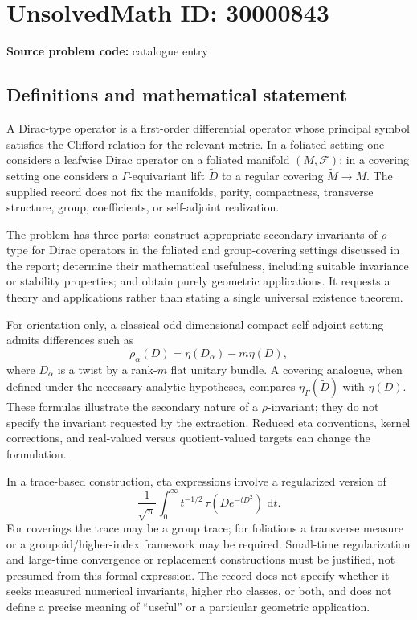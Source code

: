\documentclass[11pt]{article}
\newcommand{\dd}{\,\mathrm{d}}
\begin{document}
\section*{UnsolvedMath ID: 30000843}
\textbf{Source problem code:} catalogue entry
\subsection{Definitions and mathematical statement}
A Dirac-type operator is a first-order differential operator whose principal symbol satisfies the Clifford relation for the relevant metric. In a foliated setting one considers a leafwise Dirac operator on a foliated manifold \((M,\mathcal F)\); in a covering setting one considers a \(\Gamma\)-equivariant lift \(\widetilde D\) to a regular covering \(\widetilde M\to M\). The supplied record does not fix the manifolds, parity, compactness, transverse structure, group, coefficients, or self-adjoint realization.

The problem has three parts: construct appropriate secondary invariants of \(\rho\)-type for Dirac operators in the foliated and group-covering settings discussed in the report; determine their mathematical usefulness, including suitable invariance or stability properties; and obtain purely geometric applications. It requests a theory and applications rather than stating a single universal existence theorem.

For orientation only, a classical odd-dimensional compact self-adjoint setting admits differences such as
\[
 \rho_\alpha(D)=\eta(D_\alpha)-m\eta(D),
\]
where \(D_\alpha\) is a twist by a rank-\(m\) flat unitary bundle. A covering analogue, when defined under the necessary analytic hypotheses, compares \(\eta_\Gamma(\widetilde D)\) with \(\eta(D)\). These formulas illustrate the secondary nature of a \(\rho\)-invariant; they do not specify the invariant requested by the extraction. Reduced eta conventions, kernel corrections, and real-valued versus quotient-valued targets can change the formulation.

In a trace-based construction, eta expressions involve a regularized version of
\[
 \frac1{\sqrt\pi}\int_0^\infty
 t^{-1/2}\,\tau(D e^{-tD^2})\,\dd t.
\]
For coverings the trace may be a group trace; for foliations a transverse measure or a groupoid/higher-index framework may be required. Small-time regularization and large-time convergence or replacement constructions must be justified, not presumed from this formal expression. The record does not specify whether it seeks measured numerical invariants, higher rho classes, or both, and does not define a precise meaning of ``useful'' or a particular geometric application.
\end{document}
